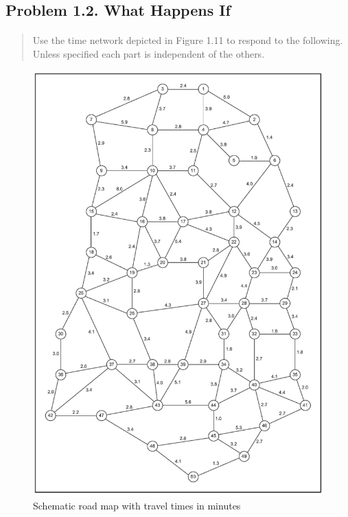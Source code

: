 \subsection{Problem 1.2. What Happens If}

\paragraph{}
\begin{quote}
Use the time network depicted in Figure 1.11 to respond to the following. Unless specified each part is independent of the others.
\end{quote}

\begin{figure}[H]
\centering
\includegraphics[scale=1]{./img/figure1-11.png}
\caption{Schematic road map with travel times in minutes}
\label{figure1-10}
\end{figure}

